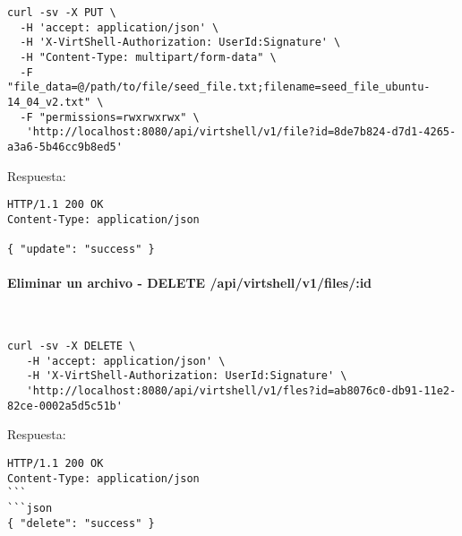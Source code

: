 \begin{lstlisting}[style=json]
curl -sv -X PUT \
  -H 'accept: application/json' \
  -H 'X-VirtShell-Authorization: UserId:Signature' \
  -H "Content-Type: multipart/form-data" \
  -F "file_data=@/path/to/file/seed_file.txt;filename=seed_file_ubuntu-14_04_v2.txt" \
  -F "permissions=rwxrwxrwx" \
   'http://localhost:8080/api/virtshell/v1/file?id=8de7b824-d7d1-4265-a3a6-5b46cc9b8ed5'
\end{lstlisting}

\vspace{1cm}
Respuesta:
\vspace{1cm}

\begin{lstlisting}[style=json]
HTTP/1.1 200 OK
Content-Type: application/json

{ "update": "success" }
\end{lstlisting}


\paragraph{Eliminar un archivo - DELETE /api/virtshell/v1/files/:id} ~\\

\begin{lstlisting}[style=json]
curl -sv -X DELETE \
   -H 'accept: application/json' \
   -H 'X-VirtShell-Authorization: UserId:Signature' \
   'http://localhost:8080/api/virtshell/v1/fles?id=ab8076c0-db91-11e2-82ce-0002a5d5c51b'
\end{lstlisting}

\vspace{1cm}
Respuesta:
\vspace{1cm}

\begin{lstlisting}[style=json]
HTTP/1.1 200 OK
Content-Type: application/json
```
```json
{ "delete": "success" }
\end{lstlisting}
